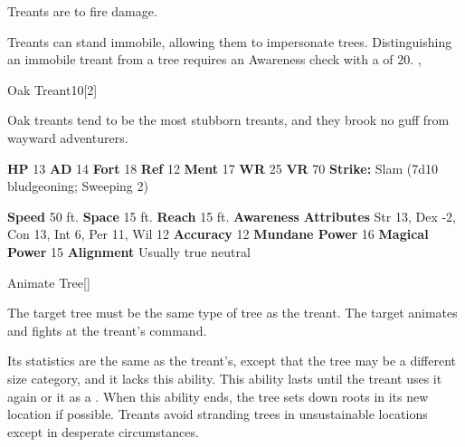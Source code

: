         Treants are  to fire damage.
      
        Treants can stand immobile, allowing them to impersonate trees.
        Distinguishing an immobile treant from a tree requires an Awareness check with a  of 20.
  ,
  \begin{monsubsection}{Oak Treant}{10}[2]
    \vspace{-1em}\vspace{-1em}
    \vspace{0em}

    
        Oak treants tend to be the most stubborn treants, and they brook no guff from wayward adventurers.
      
    

    \begin{spellcontent}
      \begin{spelltargetinginfo}
        \pari \textbf{HP} 13 \monsep
          \textbf{AD} 14 \monsep
          \textbf{Fort} 18 \monsep
          \textbf{Ref} 12 \monsep
          \textbf{Ment} 17
        \pari \textbf{WR} 25 \monsep
        \textbf{VR} 70
        \pari \textbf{Strike:}
            Slam  (7d10 bludgeoning; Sweeping 2)
      \end{spelltargetinginfo}
    \end{spellcontent}
    \begin{monsterfooter}
      \pari \textbf{Speed} 50 ft. \monsep
        \textbf{Space} 15 ft. \monsep
        \textbf{Reach} 15 ft.
      \pari \textbf{Awareness} 
      \pari \textbf{Attributes}
        Str 13, Dex -2,
        Con 13, Int 6,
        Per 11, Wil 12
      \pari \textbf{Accuracy} 12 \monsep
        \textbf{Mundane Power} 16 \monsep
      \textbf{Magical Power} 15
      \pari \textbf{Alignment} Usually true neutral
    \end{monsterfooter}
  \end{monsubsection}
  \begin{freeability}{Animate Tree}[]
      
        The target tree must be the same type of tree as the treant.
        The target animates and fights at the treant's command.

        Its statistics are the same as the treant's, except that the tree may be a different size category, and it lacks this ability.
        This ability lasts until the treant uses it again or  it as a .
        When this ability ends, the tree sets down roots in its new location if possible.
        Treants avoid stranding trees in unsustainable locations except in desperate circumstances.
      
    \end{freeability}
  
